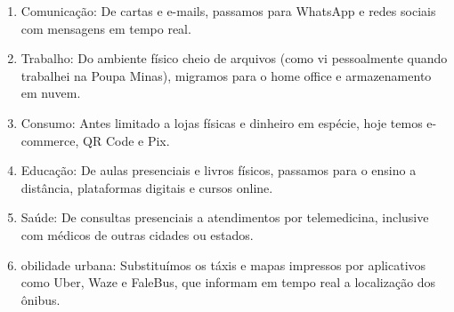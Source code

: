 \documentclass[12pt,a4paper]{article}
\begin{document}
    \begin{enumerate}[label=\Roman*]
      \item Comunicação: De cartas e e-mails, passamos para WhatsApp e redes sociais com mensagens em tempo real.
      \item Trabalho: Do ambiente físico cheio de arquivos (como vi pessoalmente quando trabalhei na Poupa Minas), migramos para o home office e armazenamento em nuvem.
      \item	Consumo: Antes limitado a lojas físicas e dinheiro em espécie, hoje temos e-commerce, QR Code e Pix.
      \item Educação: De aulas presenciais e livros físicos, passamos para o ensino a distância, plataformas digitais e cursos online.
      \item Saúde: De consultas presenciais a atendimentos por telemedicina, inclusive com médicos de outras cidades ou estados.
      \item obilidade urbana: Substituímos os táxis e mapas impressos por aplicativos como Uber, Waze e FaleBus, que informam em tempo real a localização dos ônibus.
    \end{enumerate}
\end{document}
